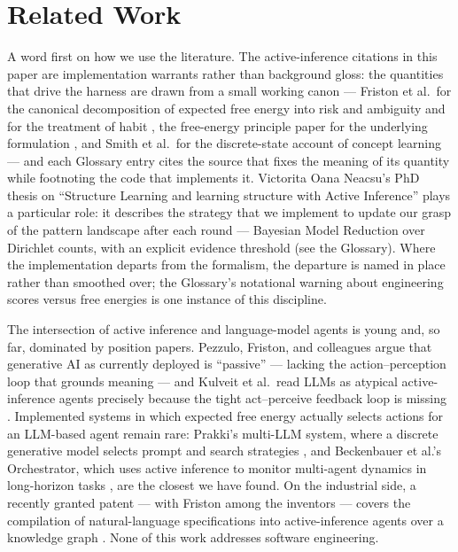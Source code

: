 \section{Related Work}\label{sec:related}

A word first on how we use the literature.  The active-inference citations in this paper are implementation warrants rather than background gloss: the quantities that drive the harness are drawn from a small working canon --- Friston et al.\ for the canonical decomposition of expected free energy into risk and ambiguity and for the treatment of habit \cite{FRISTON2016862}, the free-energy principle paper for the underlying formulation \cite{friston2019freeenergyprincipleparticular}, and Smith et al.\ for the discrete-state account of concept learning \cite{smith2020structure} --- and each Glossary entry cites the source that fixes the meaning of its quantity while footnoting the code that implements it.  Victorita Oana Neacsu's PhD thesis on ``Structure Learning and learning structure with Active Inference'' \cite{neacsu2024structure} plays a particular role: it describes the strategy that we implement to update our grasp of the pattern landscape after each round --- Bayesian Model Reduction over Dirichlet counts, with an explicit evidence threshold (see the Glossary).  Where the implementation departs from the formalism, the departure is named in place rather than smoothed over; the Glossary's notational warning about engineering scores versus free energies is one instance of this discipline.

The intersection of active inference and language-model agents is young and, so far, dominated by position papers.  Pezzulo, Friston, and colleagues argue that generative AI as currently deployed is ``passive'' --- lacking the action--perception loop that grounds meaning \cite{pezzulo2024generating} --- and Kulveit et al.\ read LLMs as atypical active-inference agents precisely because the tight act--perceive feedback loop is missing \cite{kulveit2023predictive}.  Implemented systems in which expected free energy actually selects actions for an LLM-based agent remain rare: Prakki's multi-LLM system, where a discrete generative model selects prompt and search strategies \cite{prakki2024active}, and Beckenbauer et al.'s Orchestrator, which uses active inference to monitor multi-agent dynamics in long-horizon tasks \cite{beckenbauer2025orchestrator}, are the closest we have found.  On the industrial side, a recently granted patent --- with Friston among the inventors --- covers the compilation of natural-language specifications into active-inference agents over a knowledge graph \cite{verses2025patent}.  None of this work addresses software engineering.

